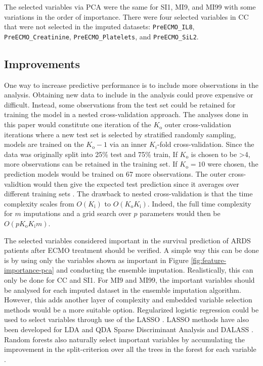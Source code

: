 \documentclass[12pt,]{article}
\begin{document}
The selected variables via PCA were the same for SI1, MI9, and MI99 with
some variations in the order of importance. There were four selected
variables in CC that were not selected in the imputed datasets:
\texttt{PreECMO\_IL8}, \texttt{PreECMO\_Creatinine},
\texttt{PreECMO\_Platelets}, and \texttt{PreECMO\_SiL2}.

\subsection{Improvements}\label{improvements}

One way to increase predictive performance is to include more
observations in the analysis. Obtaining new data to include in the
analysis could prove expensive or difficult. Instead, some observations
from the test set could be retained for training the model in a nested
cross-validation approach. The analyses done in this paper would
constitute one iteration of the \(K_\text{o}\) outer cross-validation
iterations where a new test set is selected by stratified randomly
sampling, models are trained on the \(K_\text{o}-1\) via an inner
\(K_{i}\)-fold cross-validation. Since the data was originally split
into 25\% test and 75\% train, If \(K_\text{o}\) is chosen to be
\textgreater{}4, more observations can be retained in the training set.
If \(K_\text{o}=10\) were chosen, the prediction models would be trained
on 67 more observations. The outer cross-validtion would then give the
expected test prediction since it averages over different training sets
\autocite{hastie_elements_2009}. The drawback to nested cross-validation
is that the time complexity scales from \(O(K_\text{i})\) to
\(O(K_\text{o}K_\text{i})\). Indeed, the full time complexity for \(m\)
imputations and a grid search over \(p\) parameters would then be
\(O(pK_\text{o}K_\text{i}m)\).

The selected variables considered important in the survival prediction
of ARDS patients after ECMO treatment should be verified. A simple way
this can be done is by using only the variables shown as important in
Figure \ref{fig:feature-importance-pca} and conducting the ensemble
imputation. Realistically, this can only be done for CC and SI1. For MI9
and MI99, the important variables should be analysed for each imputed
dataset in the ensemble imputation algorithm. However, this adds another
layer of complexity and embedded variable selection methods would be a
more suitable option. Regularized logistic regression could be used to
select variables through use of the LASSO
\autocite{tibshirani_regression_1996}. LASSO methods have also been
developed for LDA and QDA Sparse Discriminant Analysis
\autocite{clemmensen_sparse_2011} and DALASS
\autocite{trendafilov_dalass:_2007}. Random forests also naturally
select important variables by accumulating the improvement in the
split-criterion over all the trees in the forest for each variable
\autocite[pp.~593]{hastie_elements_2009}.
\end{document}

